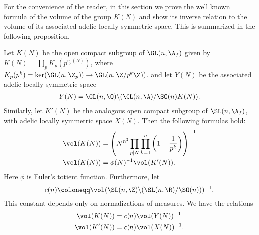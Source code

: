 \noindent For the convenience of the reader, in this section we prove the well known formula of the volume of the group $K(N)$ and show its inverse relation to the volume of its associated adelic locally symmetric space. This is summarized in the following proposition.

\begin{prop}
    Let $K(N)$ be the open compact subgroup of $\GL(n,\A_f)$ given by $K(N) = \prod_p K_p(p^{v_p(N)})$, where $K_p(p^k)=\ker(\GL(n,\Z_p))\to \GL(n,\Z/p^k\Z))$, and let $Y(N)$ be the associated adelic locally symmetric space
    \begin{align*}
        Y(N) = \GL(n,\Q)\backslash (\GL(n,\A)/\SO(n)K(N)).
    \end{align*} 
    Similarly, let $K'(N)$ be the analogous open compact subgroup of $\SL(n,\A_f)$, with adelic locally symmetric space $X(N)$. Then the following formulas hold:
    \begin{align}
        \label{volformula}\vol(K(N)) &= \left(N^{n^2}\prod_{p\mid N}\prod_{k=1}^{n}\left(1-\frac{1}{p^k}\right)\right)^{-1}\\
        \label{relatevol}\vol(K(N)) &= \phi(N)^{-1}\vol(K'(N)).
    \end{align}
    Here $\phi$ is Euler's totient function. Furthermore, let
    $$c(n)\coloneqq \vol(\SL(n,\Z)\backslash(\SL(n,\R)/\SO(n)))^{-1}.$$
    This constant depends only on normalizations of measures. We have the relations
    \begin{align}
        \label{GLnspacevol}\vol(K(N)) &= c(n) \vol(Y(N))^{-1}\\
        \label{SLnspacevol}\vol(K'(N)) &= c(n) \vol(X(N))^{-1}.
    \end{align}
\end{prop}

